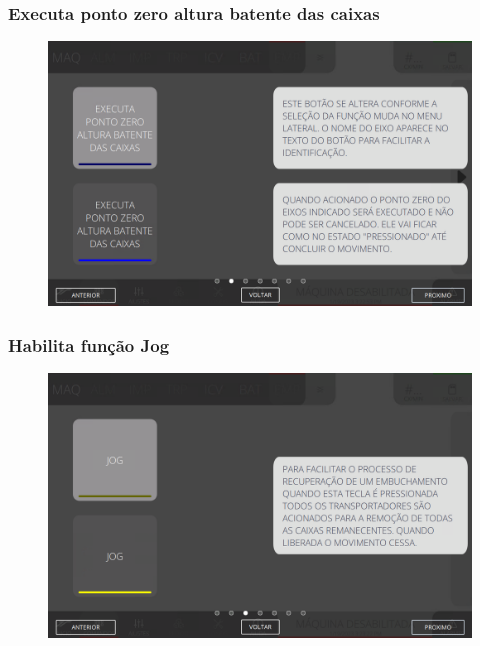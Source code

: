 \newpage
\thispagestyle{fancy}
\vspace*{40 pt}
\subsubsection{\small{Executa ponto zero altura batente das caixas}} \label{sec:telaComandosEmpilhadorExecutaPontoZeroAlturaBatenteCaixas}
\vspace*{\fill}
\begin{figure}[h]
    \centering
    \includegraphics[width=576 px,height=360 px]{src/imagesICV/08-stacker/commands/e-7.png}
\end{figure}
\vspace*{\fill}

\newpage
\thispagestyle{fancy}
\vspace*{40 pt}
\subsubsection{\small{Habilita função Jog}} \label{sec:telaComandosEmpilhadorHabilitaFuncaoJog}
\vspace*{\fill}
\begin{figure}[h]
    \centering
    \includegraphics[width=576 px,height=360 px]{src/imagesICV/08-stacker/commands/e-8.png}
\end{figure}
\vspace*{\fill}

